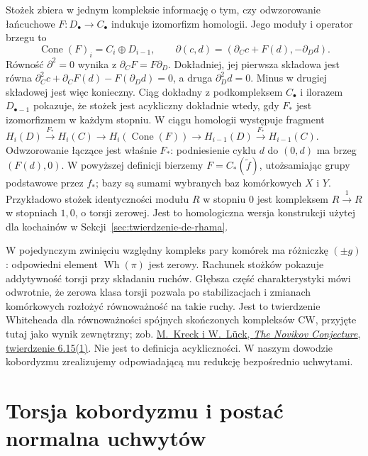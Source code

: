 \begin{uwaga}
Stożek zbiera w jednym kompleksie informację o tym, czy
odwzorowanie łańcuchowe $F:D_\bullet\to C_\bullet$
indukuje izomorfizm homologii. Jego moduły i operator brzegu to
\[
 \operatorname{Cone}(F)_i=C_i\oplus D_{i-1},\qquad
 \partial(c,d)=(\partial_Cc+F(d),-\partial_Dd).
\]
Równość $\partial^2=0$ wynika z $\partial_CF=F\partial_D$.
Dokładniej, jej pierwsza składowa jest równa
$\partial_C^2c+\partial_CF(d)-F(\partial_Dd)=0$,
a druga $\partial_D^2d=0$. Minus w drugiej składowej
jest więc konieczny.
Ciąg dokładny z podkompleksem $C_\bullet$ i ilorazem
$D_{\bullet-1}$ pokazuje, że stożek jest acykliczny dokładnie
wtedy, gdy $F_*$ jest izomorfizmem w każdym stopniu.
W ciągu homologii występuje fragment
$H_i(D)\xrightarrow{F_*}H_i(C)\to H_i(\operatorname{Cone}(F))
\to H_{i-1}(D)\xrightarrow{F_*}H_{i-1}(C)$.
Odwzorowanie łączące jest właśnie $F_*$: podniesienie cyklu
$d$ do $(0,d)$ ma brzeg $(F(d),0)$.
W powyższej definicji bierzemy $F=C_*(\widetilde f)$,
utożsamiając grupy podstawowe przez $f_*$;
bazy są sumami wybranych baz komórkowych $X$ i $Y$.
Przykładowo stożek identyczności modułu $R$ w stopniu $0$
jest kompleksem $R\xrightarrow{1}R$ w stopniach $1,0$,
o torsji zerowej. Jest to homologiczna wersja konstrukcji
użytej dla kochainów w Sekcji~\ref{sec:twierdzenie-de-rhama}.
\end{uwaga}

\begin{uwaga}
\label{uwaga:wh-charakterystyka-20}
W pojedynczym zwinięciu względny kompleks pary
komórek ma różniczkę $(\pm g)$: odpowiedni element
$\operatorname{Wh}(\pi)$ jest zerowy. Rachunek stożków
pokazuje addytywność torsji przy składaniu ruchów.
Głębsza część charakterystyki mówi odwrotnie, że
zerowa klasa torsji pozwala po stabilizacjach i
zmianach komórkowych rozłożyć równoważność na takie
ruchy. Jest to twierdzenie Whiteheada dla równoważności
spójnych skończonych kompleksów CW, przyjęte tutaj jako wynik
zewnętrzny; zob.
\href{https://webhomes.maths.ed.ac.uk/~v1ranick/papers/owsem.pdf}
{M.\ Kreck i W.\ Lück, \emph{The Novikov Conjecture}, twierdzenie 6.15(1)}.
Nie jest to definicja acykliczności. W naszym dowodzie
kobordyzmu zrealizujemy odpowiadającą mu redukcję
bezpośrednio uchwytami.
\end{uwaga}

\section{Torsja kobordyzmu i postać normalna uchwytów}
\label{sec:torsja-kobordyzmu-20}

